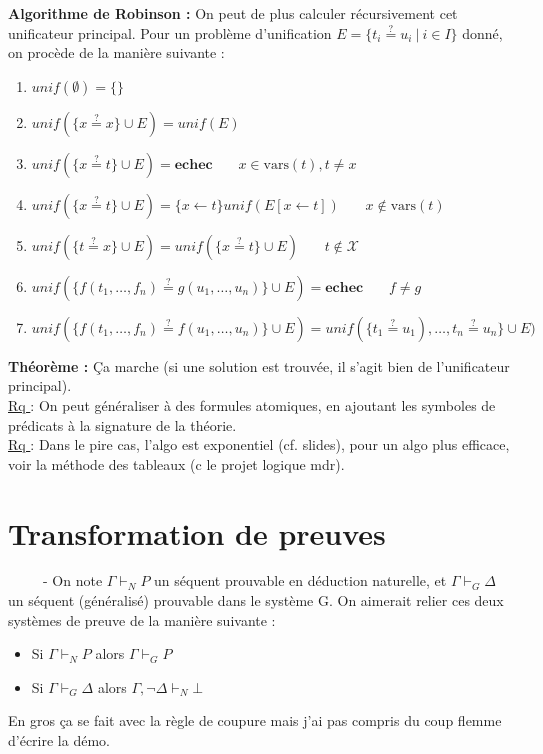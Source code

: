 \documentclass[11pt,a4paper]{article}
\begin{document}
\textbf{Algorithme de Robinson :} On peut de plus calculer récursivement cet unificateur principal. Pour un problème d'unification $E = \{ t_i\stackrel{?}{=} u_i \ | \ i \in I \}$ donné, on procède de la manière suivante :
\begin{enumerate}
\item $unif(\emptyset)=\{\}$
\item $unif(\{x \stackrel{?}{=}x \} \cup E)=unif(E)$
\item $unif(\{x \stackrel{?}{=}t \} \cup E)=\textbf{echec}$ \ \ \ $x \in \text{vars}(t), t\neq x$
\item $unif(\{x \stackrel{?}{=}t \} \cup E)=\{x \leftarrow t\}unif(E[x\leftarrow t])$ \ \ \ $x \notin \text{vars}(t)$
\item $unif(\{t \stackrel{?}{=} x \} \cup E)=unif(\{x \stackrel{?}{=} t\}\cup E)$ \ \ \ $t \notin \mathcal{X}$
\item $unif(\{f(t_1,\dots,f_n)\stackrel{?}{=}g(u_1,\dots,u_n)\}\cup E)=\textbf{echec}$ \ \ \ $f \neq g$
\item $unif(\{f(t_1,\dots,f_n)\stackrel{?}{=}f(u_1,\dots,u_n)\}\cup E)=unif(\{t_1\stackrel{?}{=}u_1),\dots,t_n\stackrel{?}{=}u_n\}\cup E)$ \\
\end{enumerate}

\textbf{Théorème :} Ça marche (si une solution est trouvée, il s’agit bien de l’unificateur principal).\\

\underline{Rq }: On peut généraliser à des formules atomiques, en ajoutant les symboles de prédicats à la signature de la théorie. \\

\underline{Rq }: Dans le pire cas, l'algo est exponentiel (cf. slides), pour un algo plus efficace, voir la méthode des tableaux (c le projet logique mdr).

\section{Transformation de preuves}

\ \ \ \ \ - On note $\Gamma \vdash_N P$ un séquent prouvable en déduction naturelle, et $\Gamma \vdash_G \Delta$ un séquent (généralisé) prouvable dans le système G. On aimerait relier ces deux systèmes de preuve de la manière suivante :
\begin{itemize}
\item Si $\Gamma \vdash_N P$ alors $\Gamma \vdash_G P$
\item Si $\Gamma \vdash_G \Delta$ alors $\Gamma, \lnot \Delta \vdash_N \bot$ \\
\end{itemize}

En gros ça se fait avec la règle de coupure mais j'ai pas compris du coup flemme d'écrire la démo. \\
\end{document}
